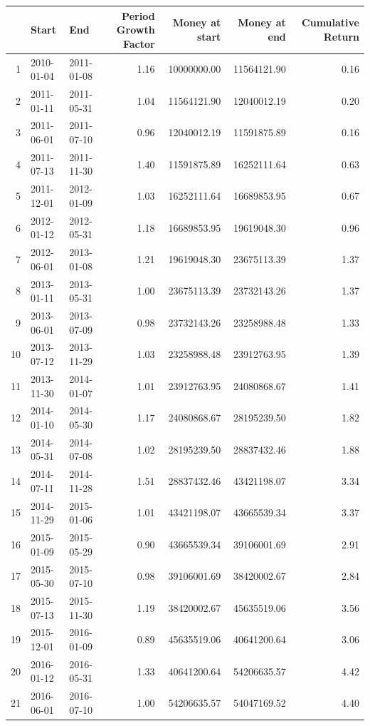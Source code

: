 \begin{appendices}
\begin{table}[H]
\begin{tabular}{rllrrrr}
  \hline
 & Start & End & Period Growth Factor & Money at start & Money at end & Cumulative Return \\ 
  \hline
1 & 2010-01-04 & 2011-01-08 & 1.16 & 10000000.00 & 11564121.90 & 0.16 \\ 
  2 & 2011-01-11 & 2011-05-31 & 1.04 & 11564121.90 & 12040012.19 & 0.20 \\ 
  3 & 2011-06-01 & 2011-07-10 & 0.96 & 12040012.19 & 11591875.89 & 0.16 \\ 
  4 & 2011-07-13 & 2011-11-30 & 1.40 & 11591875.89 & 16252111.64 & 0.63 \\ 
  5 & 2011-12-01 & 2012-01-09 & 1.03 & 16252111.64 & 16689853.95 & 0.67 \\ 
  6 & 2012-01-12 & 2012-05-31 & 1.18 & 16689853.95 & 19619048.30 & 0.96 \\ 
  7 & 2012-06-01 & 2013-01-08 & 1.21 & 19619048.30 & 23675113.39 & 1.37 \\ 
  8 & 2013-01-11 & 2013-05-31 & 1.00 & 23675113.39 & 23732143.26 & 1.37 \\ 
  9 & 2013-06-01 & 2013-07-09 & 0.98 & 23732143.26 & 23258988.48 & 1.33 \\ 
  10 & 2013-07-12 & 2013-11-29 & 1.03 & 23258988.48 & 23912763.95 & 1.39 \\ 
  11 & 2013-11-30 & 2014-01-07 & 1.01 & 23912763.95 & 24080868.67 & 1.41 \\ 
  12 & 2014-01-10 & 2014-05-30 & 1.17 & 24080868.67 & 28195239.50 & 1.82 \\ 
  13 & 2014-05-31 & 2014-07-08 & 1.02 & 28195239.50 & 28837432.46 & 1.88 \\ 
  14 & 2014-07-11 & 2014-11-28 & 1.51 & 28837432.46 & 43421198.07 & 3.34 \\ 
  15 & 2014-11-29 & 2015-01-06 & 1.01 & 43421198.07 & 43665539.34 & 3.37 \\ 
  16 & 2015-01-09 & 2015-05-29 & 0.90 & 43665539.34 & 39106001.69 & 2.91 \\ 
  17 & 2015-05-30 & 2015-07-10 & 0.98 & 39106001.69 & 38420002.67 & 2.84 \\ 
  18 & 2015-07-13 & 2015-11-30 & 1.19 & 38420002.67 & 45635519.06 & 3.56 \\ 
  19 & 2015-12-01 & 2016-01-09 & 0.89 & 45635519.06 & 40641200.64 & 3.06 \\ 
  20 & 2016-01-12 & 2016-05-31 & 1.33 & 40641200.64 & 54206635.57 & 4.42 \\ 
  21 & 2016-06-01 & 2016-07-10 & 1.00 & 54206635.57 & 54047169.52 & 4.40 \\ 

\end{tabular}
\end{table}
\end{appendices}
